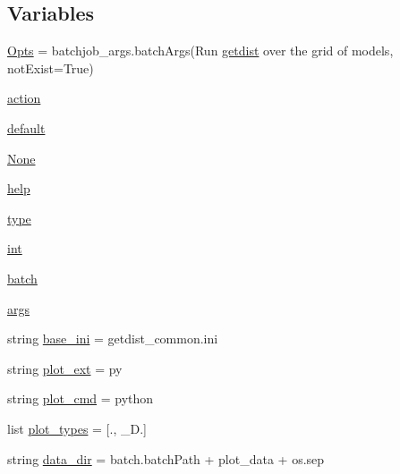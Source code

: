 \subsection*{Variables}
\begin{DoxyCompactItemize}
\item 
\mbox{\hyperlink{namespacerunGridGetdist_ab4ba97b6bbddb8d6fe5730b6b75e1f2e}{Opts}} = batchjob\+\_\+args.\+batch\+Args(\textquotesingle{}Run \mbox{\hyperlink{GetDist_8f90_a78c185cfd3ac27937ede022b24ae72e9}{getdist}} over the grid of models\textquotesingle{}, not\+Exist=True)
\item 
\mbox{\hyperlink{namespacerunGridGetdist_a548b0ce2efd48390ee6b17f5e497d949}{action}}
\item 
\mbox{\hyperlink{namespacerunGridGetdist_a67d379c99e2d288689d45542651ec0fe}{default}}
\item 
\mbox{\hyperlink{namespacerunGridGetdist_a0fe4bd90598c3a3e0f375c9f6f62bfec}{None}}
\item 
\mbox{\hyperlink{namespacerunGridGetdist_a8e0f7c917fa369f9b78a52a760d22fbf}{help}}
\item 
\mbox{\hyperlink{namespacerunGridGetdist_a4462e2519390f88e018a551ce5096e7b}{type}}
\item 
\mbox{\hyperlink{namespacerunGridGetdist_adcf637f2f71d6ee44c252bc587e24fce}{int}}
\item 
\mbox{\hyperlink{namespacerunGridGetdist_aed9e8ead991491dba3554a0be28cd268}{batch}}
\item 
\mbox{\hyperlink{namespacerunGridGetdist_a2543c8cbdae519ef69a57dc6eb1c3b1c}{args}}
\item 
string \mbox{\hyperlink{namespacerunGridGetdist_a298c973c76d3f93b56cee7ae7dce0844}{base\+\_\+ini}} = \textquotesingle{}getdist\+\_\+common.\+ini\textquotesingle{}
\item 
string \mbox{\hyperlink{namespacerunGridGetdist_ad09f12ee757e68c755b7a98f93f98507}{plot\+\_\+ext}} = \textquotesingle{}py\textquotesingle{}
\item 
string \mbox{\hyperlink{namespacerunGridGetdist_afe2fd22a9fc8f846e5183919a2d39d86}{plot\+\_\+cmd}} = \textquotesingle{}python\textquotesingle{}
\item 
list \mbox{\hyperlink{namespacerunGridGetdist_a1b1af7bc40b846c3877c21e2891f5c3e}{plot\+\_\+types}} = \mbox{[}\textquotesingle{}.\textquotesingle{}, \textquotesingle{}\+\_\+D.\textquotesingle{}\mbox{]}
\item 
string \mbox{\hyperlink{namespacerunGridGetdist_ad04f8846c3ee6d85a6faaedf8a3e3af8}{data\+\_\+dir}} = batch.\+batch\+Path + \textquotesingle{}plot\+\_\+data\textquotesingle{} + os.\+sep

\end{DoxyCompactItemize}
